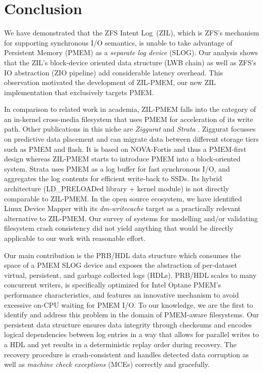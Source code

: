 \documentclass[12pt,a4paper,twoside]{book}
\begin{document}
\chapter{Conclusion}\label{ch:conclusion}

We have demonstrated that the ZFS Intent Log~(ZIL), which is ZFS's mechanism for supporting synchronous I/O semantics, is unable to take advantage of Persistent Memory (PMEM) as a \textit{separate log device} (SLOG).
Our analysis shows that the ZIL's block-device oriented data structure (LWB chain) as well as ZFS's IO abstraction (ZIO pipeline) add considerable latency overhead.
This observation motivated the development of ZIL-PMEM, our new ZIL implementation that exclusively targets PMEM.

In comparison to related work in academia, ZIL-PMEM falls into the category of an in-kernel cross-media filesystem that uses PMEM for acceleration of its write path.
Other publications in this niche are \textit{Ziggurat} and \textit{Strata} \cite{zhengZigguratTieredFile2019,kwonStrataCrossMedia2017}.
Ziggurat focusses on predictive data placement and can migrate data between different storage tiers such as PMEM and flash.
It is based on NOVA-Fortis and thus a PMEM-first design whereas ZIL-PMEM starts to introduce PMEM into a block-oriented system.
Strata uses PMEM as a log buffer for fast synchronous I/O, and aggregates the log contents for efficient write-back to SSDs.
Its hybrid architecture (LD\_PRELOADed library + kernel module) is not directly comparable to ZIL-PMEM.
In the open source ecosystem, we have identified Linux Device Mapper with its \textit{dm-writecache} target as a practically relevant alternative to \mbox{ZIL-PMEM}.
Our survey of systems for modelling and/or validating filesystem crash consistency did not yield anything that would be directly applicable to our work with reasonable effort.

Our main contribution is the PRB/HDL data structure which consumes the space of a PMEM SLOG device and exposes the abstraction of per-dataset virtual, persistent, and garbage collected logs (HDLs).
PRB/HDL scales to many concurrent writers, is specifically optimized for Intel Optane PMEM's performance characteristics, and features an innovative mechanism to avoid excessive on-CPU waiting for PMEM I/O.
To our knowledge, we are the first to identify and address this problem in the domain of PMEM-aware filesystems.
Our persistent data structure ensures data integrity through checksums and encodes logical dependencies between log entries in a way that allows for parallel writes to a HDL and yet results in a deterministic replay order during recovery.
The recovery procedure is crash-consistent and handles detected data corruption as well as \textit{machine check exceptions} (MCEs) correctly and gracefully.
\end{document}
